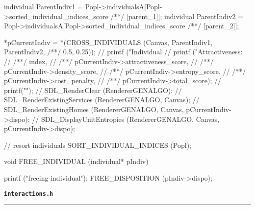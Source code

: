 \begin{C}
{{		individual ParentIndiv1 = Popl->individualsA[Popl->sorted_individual_indices_score
		/**/ [parent_1]];
		individual ParentIndiv2 = Popl->individualsA[Popl->sorted_individual_indices_score
		/**/ [parent_2]];
		
		*pCurrentIndiv = *(CROSS_INDIVIDUALS (Canvas, ParentIndiv1, ParentIndiv2,
		/**/ 0.5, 0.25));
		// printf ("Individual %
		// printf ("Attractiveness: %
		// /**/ index,
		// /**/ pCurrentIndiv->attractiveness_score,
		// /**/ pCurrentIndiv->density_score,
		// /**/ pCurrentIndiv->entropy_score,
		// /**/ pCurrentIndiv->cost_penalty,
		// /**/ pCurrentIndiv->total_score);
		// printf("\n");
		// SDL_RenderClear (RendererGENALGO);
		// SDL_RenderExistingServices (RendererGENALGO, Canvas);
		// SDL_RenderExistingHomes (RendererGENALGO, Canvas, pCurrentIndiv->dispo);
		// SDL_DisplayUnitEntropies (RendererGENALGO, Canvas, pCurrentIndiv->dispo);
	}
	
	// resort individuals
	SORT_INDIVIDUAL_INDICES (Popl);
}


void FREE_INDIVIDUAL (individual* pIndiv){
	
	printf ("freeing individual\n");
	FREE_DISPOSITION (pIndiv->dispo);
}

\end{C}
\vspace*{5mm}
{\Large \texttt{\textbf{interactions.h}}}
\vspace*{1mm}
\hrule
